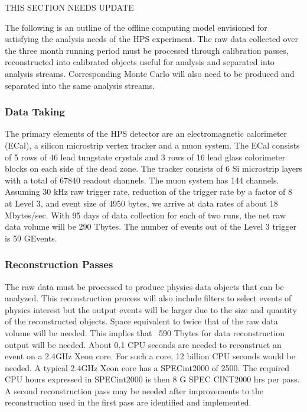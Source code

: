 

{\color{red} THIS SECTION NEEDS UPDATE}


The following is an outline of the offline computing model envisioned for satisfying the analysis needs of the HPS experiment. The raw data collected over the three month running period must be processed through calibration passes, reconstructed into calibrated objects useful for analysis and separated into analysis streams. Corresponding Monte Carlo will also need to be produced and separated into the same analysis streams.


\subsubsection{Data Taking}
The primary elements of the HPS detector are an electromagnetic calorimeter (ECal), a silicon microstrip vertex tracker and a muon system. The ECal consists of 5 rows of 46 lead tungstate crystals and 3 rows of 16 lead glass colorimeter blocks on each side of the dead zone. The tracker consists of 6 Si microstrip layers with a total of 67840 readout channels. The muon system has 144 channels. Assuming 30 kHz raw trigger rate, reduction of the trigger rate by a factor of 8 at Level 3, and event size of 4950 bytes, we arrive at data rates of about 18 Mbytes/sec. With 95 days of data collection for each of two runs, the net raw data volume will be 290 Tbytes. The number of events out of the Level 3 trigger is 59 GEvents.

\subsubsection{Reconstruction Passes}
The raw data must be processed to produce physics data objects that can be analyzed. This reconstruction process will also include filters to select events of physics interest but the output events will be larger due to the size and quantity of the reconstructed objects. Space equivalent to twice that of the raw data volume will be needed. This implies that ~590 Tbytes for data reconstruction output will be needed. About 0.1 CPU seconds are needed to reconstruct an event on a 2.4GHz Xeon core. For such a core, 12 billion CPU seconds would be needed. A typical 2.4GHz Xeon core has a SPECint2000 of 2500. The required CPU hours expressed in SPECint2000 is then 8 G SPEC CINT2000 hrs per pass. A second reconstruction pass may be needed after improvements to the reconstruction used in the first pass are identified and implemented.

